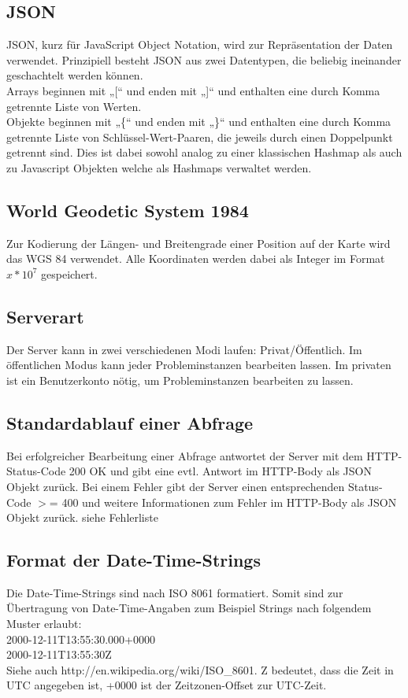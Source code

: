 \documentclass[ngerman,titlepage,parskip=true]{scrartcl}
\begin{document}
	\subsection{JSON}
	 
	JSON, kurz für JavaScript Object Notation, wird zur Repräsentation der Daten verwendet.
	Prinzipiell besteht JSON aus zwei Datentypen, die beliebig ineinander geschachtelt werden können. \\
	Arrays beginnen mit „[“ und enden mit „]“ und enthalten eine durch Komma getrennte Liste von Werten. \\
	Objekte beginnen mit „\{“ und enden mit „\}“ und enthalten eine durch Komma getrennte Liste von Schlüssel-Wert-Paaren, die jeweils durch einen Doppelpunkt getrennt sind.
	Dies ist dabei sowohl analog zu einer klassischen Hashmap als auch zu Javascript Objekten welche als Hashmaps verwaltet werden.
	
	\subsection{World Geodetic System 1984}
	
	Zur Kodierung der Längen- und Breitengrade einer Position auf der Karte wird das WGS 84 verwendet. Alle Koordinaten werden dabei als Integer im Format $x*10^7$ gespeichert.
	
	\subsection*{Serverart}
	Der Server kann in zwei verschiedenen Modi laufen: Privat/Öffentlich. Im öffentlichen Modus kann jeder Probleminstanzen bearbeiten lassen. Im privaten ist ein Benutzerkonto nötig, um Probleminstanzen bearbeiten zu lassen.
	
	\subsection{Standardablauf einer Abfrage}
	Bei erfolgreicher Bearbeitung einer Abfrage antwortet der Server mit dem HTTP-Status-Code 200 OK und gibt eine evtl. Antwort im HTTP-Body als JSON Objekt zurück. Bei einem Fehler gibt der Server einen entsprechenden Status-Code $>$= 400 und weitere Informationen zum Fehler im HTTP-Body als JSON Objekt zurück. siehe Fehlerliste %
	
	\subsection{Format der Date-Time-Strings}
	Die Date-Time-Strings sind nach ISO 8061 formatiert. Somit sind zur Übertragung von Date-Time-Angaben zum Beispiel Strings nach folgendem Muster erlaubt: \\
	2000-12-11T13:55:30.000+0000\\
	2000-12-11T13:55:30Z\\
Siehe auch http://en.wikipedia.org/wiki/ISO{\_}8601. Z bedeutet, dass die Zeit in UTC angegeben ist, +0000 ist der Zeitzonen-Offset zur UTC-Zeit.	
\end{document}
